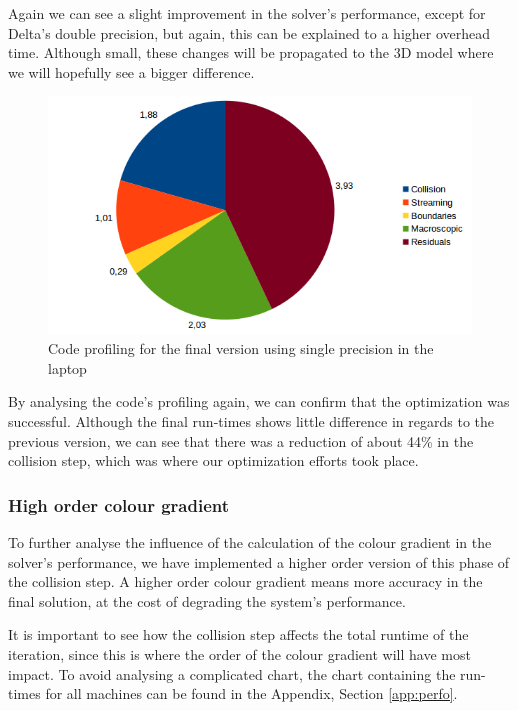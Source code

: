 \documentclass[12pt, openany]{book}
\begin{document}
  Again we can see a slight improvement in the solver's performance, except for Delta's double precision, but again, this can be explained to a higher overhead time. Although small, these changes will be propagated to the 3D model where we will hopefully see a bigger difference.
  
  \begin{figure}[H]
  	\centering
  	\includegraphics[width=\linewidth]{Resources/Images/vfvprofile.png}
  	\caption{Code profiling for the final version using single precision in the laptop}
  	\label{fig:vfvprofile}
  \end{figure}
  
  By analysing the code's profiling again, we can confirm that the optimization was successful. Although the final run-times shows little difference in regards to the previous version, we can see that there was a reduction of about 44\% in the collision step, which was where our optimization efforts took place.
  
\subsubsection{High order colour gradient}
To further analyse the influence of the calculation of the colour gradient in the solver's performance, we have implemented a higher order version of this phase of the collision step. A higher order colour gradient means more accuracy in the final solution, at the cost of degrading the system's performance.\par
It is important to see how the collision step affects the total runtime of the iteration, since this is where the order of the colour gradient will have most impact. To avoid analysing a complicated chart, the chart containing the run-times for all machines can be found in the Appendix, Section \ref{app:perfo}.
\end{document}
